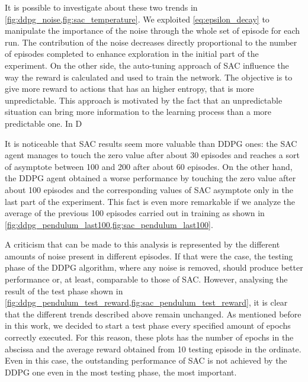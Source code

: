 It is possible to investigate about these two trends in \vref{fig:ddpg_noise,fig:sac_temperature}.
We exploited \vref{eq:epsilon_decay} to manipulate the importance of the noise through the whole set of episode for each run.
The contribution of the noise decreases directly proportional to the number of episodes completed to enhance exploration in the initial part of the experiment.
On the other side, the auto-tuning approach of SAC influence the way the reward is calculated and used to train the network. The objective is to give more reward to actions that has an higher entropy, that is more unpredictable. This approach is motivated by the fact that an unpredictable situation can bring more information to the learning process than a more predictable one.
In D

It is noticeable that SAC results seem more valuable than DDPG ones: the SAC agent manages to touch the zero value after about 30 episodes and reaches a sort of asymptote between 100 and 200 after about 60 episodes.
On the other hand, the DDPG agent obtained a worse performance by touching the zero value after about 100 episodes and the corresponding values of SAC asymptote only in the last part of the experiment.
This fact is even more remarkable if we analyze the average of the previous 100 episodes carried out in training as shown in \vref{fig:ddpg_pendulum_last100,fig:sac_pendulum_last100}.

A criticism that can be made to this analysis is represented by the different amounts of noise present in different episodes.
If that were the case, the testing phase of the DDPG algorithm, where any noise is removed, should produce better performance or, at least, comparable to those of SAC.
However, analysing the result of the test phase shown in \vref{fig:ddpg_pendulum_test_reward,fig:sac_pendulum_test_reward}, it is clear that the different trends described above remain unchanged.
As mentioned before in this work, we decided to start a test phase every specified amount of epochs correctly executed.
For this reason, these plots has the number of epochs in the abscissa and the average reward obtained from 10 testing episode in the ordinate.
Even in this case, the outstanding performance of SAC is not achieved by the DDPG one even in the most testing phase, the most important.

